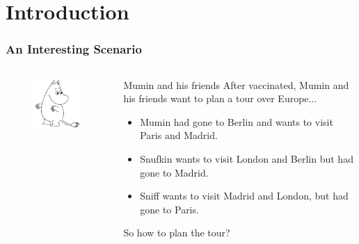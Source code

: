 \section{Introduction}

\begin{frame}
	\frametitle{An Interesting Scenario}
	\begin{columns}
		\begin{column}{.4\textwidth}
		\begin{figure}
			\centering
			\includegraphics[width=5cm]{Mumin}
		\end{figure}
		\end{column}
		\begin{column}{.5\textwidth}
		\begin{alertblock}{Mumin and his friends}
			After vaccinated, Mumin and his friends want to plan a tour over Europe...
			\begin{itemize}
				\item Mumin had gone to Berlin and wants to visit Paris and Madrid.
				\item Snufkin wants to visit London and Berlin but had gone to Madrid.
				\item Sniff wants to visit Madrid and London, but had gone to Paris.
			\end{itemize}
		So how to plan the tour?
		\end{alertblock}	
		\end{column}
	\end{columns}	
\end{frame}

